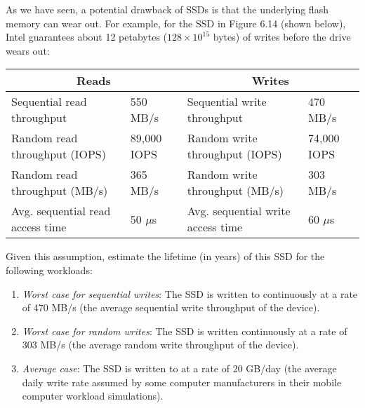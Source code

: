 \documentclass[12pt]{article}
\newenvironment{ex}[2][Exercise]{\begin{trivlist}
		\item[\hskip \labelsep {\bfseries #1}\hskip \labelsep {\bfseries #2.}]}{\end{trivlist}}
\begin{document}
\begin{ex}{6.5}
	As we have seen, a potential drawback of SSDs is that the underlying flash memory
	can wear out. For example, for the SSD in Figure 6.14 (shown below), Intel guarantees
	about 12 petabytes ($128\times 10^{15}$ bytes) of writes before the drive wears out:
	\begin{center}
		\begin{tabular}{ll|ll}
			\hline
			\multicolumn{2}{c}{Reads} &  \multicolumn{2}{c}{Writes}\\
			\hline
			Sequential read throughput & 550 MB/s
			& Sequential write throughput & 470 MB/s\\
			
			Random read throughput (IOPS) & 89,000 IOPS
			& Random write throughput (IOPS) & 74,000 IOPS\\
			
			Random read throughput (MB/s) & 365 MB/s
			& Random write throughput (MB/s) & 303 MB/s\\
			
			Avg. sequential read access time & 50 $\mu$s
			& Avg. sequential write access time & 60 $\mu$s\\
			\hline
		\end{tabular}
	\end{center}
	
	Given this assumption, estimate the lifetime (in years) of this SSD for the following	
	workloads:
	\begin{enumerate}[label=(\alph*)]
		\item \emph{Worst case for sequential writes}: The SSD is written to continuously
		at a rate of 470 MB/s (the average sequential write throughput of the device).
		\item \emph{Worst case for random writes}: The SSD is written continuously at a
		rate of 303 MB/s (the average random write throughput of the device).
		\item \emph{Average case}: The SSD is written to at a rate of 20 GB/day (the
		average daily write rate assumed by some computer manufacturers in their mobile
		computer workload simulations).
	\end{enumerate}
\end{ex}
\end{document}
